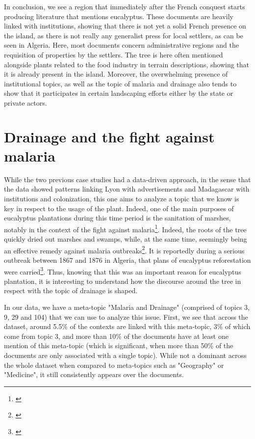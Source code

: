 In conclusion, we see a region that immediately after the French conquest starts producing literature that mentions eucalyptus. These documents are heavily linked with institutions, showing that there is not yet a solid French presence on the island, as there is not really any generalist press for local settlers, as can be seen in Algeria. Here, most documents concern administrative regions and the requisition of properties by the settlers. The tree is here often mentioned alongside plants related to the food industry in terrain descriptions, showing that it is already present in the island. Moreover, the overwhelming presence of institutional topics, as well as the topic of malaria and drainage also tends to show that it participates in certain landscaping efforts either by the state or private actors.

\section{Drainage and the fight against malaria}

While the two previous case studies had a data-driven approach, in the sense that the data showed patterns linking Lyon with advertisements and Madagascar with institutions and colonization, this one aims to analyze a topic that we know is key in respect to the usage of the plant. Indeed, one of the main purposes of eucalyptus plantations during this time period is the sanitation of marshes, notably in the context of the fight against malaria\footnote{\cite[36]{doughty_eucalyptus_2000}}. Indeed, the roots of the tree quickly dried out marshes and swamps, while, at the same time, seemingly being an effective remedy against malaria outbreaks\footnote{\cite[36]{doughty_eucalyptus_2000}}. It is reportedly during a serious outbreak between 1867 and 1876 in Algeria, that plans of eucalyptus reforestation were carried\footnote{\cite[39]{doughty_eucalyptus_2000}}. Thus, knowing that this was an important reason for eucalyptus plantation, it is interesting to understand how the discourse around the tree in respect with the topic of drainage is shaped.

In our data, we have a meta-topic "Malaria and Drainage" (comprised of topics 3, 9, 29 and 104) that we can use to analyze this issue. First, we see that across the dataset, around 5.5\% of the contexts are linked with this meta-topic, 3\% of which come from topic 3, and more than 10\% of the documents have at least one mention of this meta-topic (which is significant, when more than 50\% of the documents are only associated with a single topic). While not a dominant across the whole dataset when compared to meta-topics such as "Geography" or "Medicine", it still consistently appears over the documents. 

